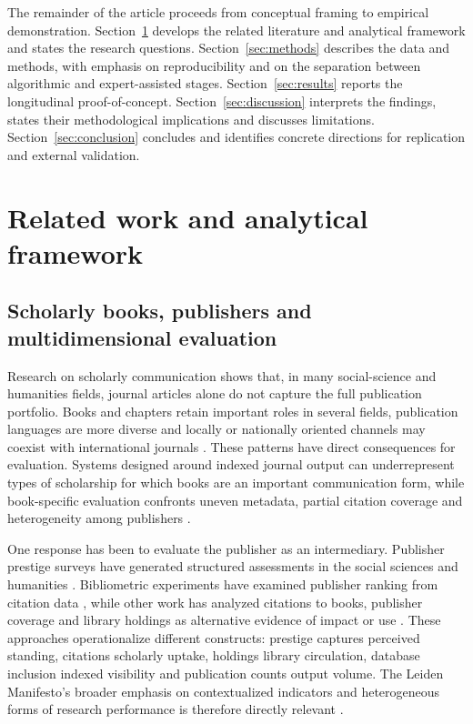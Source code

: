 \documentclass[futureinternet,article,submit,moreauthors]{Definitions/mdpi}
\begin{document}
The remainder of the article proceeds from conceptual framing to empirical demonstration. Section~\ref{sec:related} develops the related literature and analytical framework and states the research questions. Section~\ref{sec:methods} describes the data and methods, with emphasis on reproducibility and on the separation between algorithmic and expert-assisted stages. Section~\ref{sec:results} reports the longitudinal proof-of-concept. Section~\ref{sec:discussion} interprets the findings, states their methodological implications and discusses limitations. Section~\ref{sec:conclusion} concludes and identifies concrete directions for replication and external validation.

\section{Related work and analytical framework}\label{sec:related}

\subsection{Scholarly books, publishers and multidimensional evaluation}

Research on scholarly communication shows that, in many social-science and humanities fields, journal articles alone do not capture the full publication portfolio. Books and chapters retain important roles in several fields, publication languages are more diverse and locally or nationally oriented channels may coexist with international journals \citep{hicks2004four,nederhof2006bibliometric,kulczycki2018publication,engels2018books}. These patterns have direct consequences for evaluation. Systems designed around indexed journal output can underrepresent types of scholarship for which books are an important communication form, while book-specific evaluation confronts uneven metadata, partial citation coverage and heterogeneity among publishers \citep{gimenez2020books,gimenez2019books}.

One response has been to evaluate the publisher as an intermediary. Publisher prestige surveys have generated structured assessments in the social sciences and humanities \citep{gimenez2013publishers}. Bibliometric experiments have examined publisher ranking from citation data \citep{zuccala2015rank}, while other work has analyzed citations to books, publisher coverage and library holdings as alternative evidence of impact or use \citep{white2009libcitations,kousha2011books,torres2014bookcitation}. These approaches operationalize different constructs: prestige captures perceived standing, citations scholarly uptake, holdings library circulation, database inclusion indexed visibility and publication counts output volume. The Leiden Manifesto's broader emphasis on contextualized indicators and heterogeneous forms of research performance is therefore directly relevant \citep{hicks2015leiden}.
\end{document}

